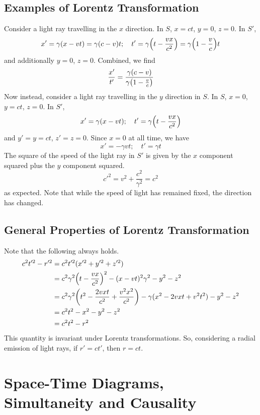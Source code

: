 \documentclass{article}
\begin{document}
\subsection{Examples of Lorentz Transformation}
Consider a light ray travelling in the $x$ direction. In $S$, $x=ct$, $y=0$, $z=0$. In $S'$,
\[ x' = \gamma(x-vt) = \gamma(c-v)t;\quad t' = \gamma\qty(t - \frac{vx}{c^2}) = \gamma\qty(1 - \frac{v}{c})t \]
and additionally $y=0$, $z=0$. Combined, we find
\[ \frac{x'}{t'} = \frac{\gamma(c - v)}{\gamma\qty(1 - \frac{v}{c})} \]
Now instead, consider a light ray travelling in the $y$ direction in $S$. In $S$, $x=0$, $y=ct$, $z=0$. In $S'$,
\[ x' = \gamma(x-vt);\quad t' = \gamma\qty(t - \frac{vx}{c^2}) \]
and $y' = y = ct$, $z' = z = 0$. Since $x=0$ at all time, we have
\[ x' = -\gamma vt;\quad t' = \gamma t \]
The square of the speed of the light ray in $S'$ is given by the $x$ component squared plus the $y$ component squared.
\[ c'^2 = v^2 + \frac{c^2}{\gamma^2} = c^2 \]
as expected. Note that while the speed of light has remained fixed, the direction has changed.

\subsection{General Properties of Lorentz Transformation}
Note that the following always holds.
\begin{align*}
	c^2 t'^2 - r'^2 & = c^2 t'^2 (x'^2 + y'^2 + z'^2)                                                                            \\
	                & = c^2 \gamma^2 \qty(t - \frac{vx}{c^2})^2 - (x - vt)^2 \gamma^2 - y^2 - z^2                                \\
	                & = c^2 \gamma^2 \qty(t^2 - \frac{2vxt}{c^2} + \frac{v^2x^2}{c^2}) - \gamma(x^2 - 2vxt + v^2t^2) - y^2 - z^2 \\
	                & = c^2 t^2 - x^2 - y^2 - z^2                                                                                \\
	                & = c^2 t^2 - r^2
\end{align*}
This quantity is invariant under Lorentz transformations. So, considering a radial emission of light rays, if $r' = ct'$, then $r = ct$.

\section{Space-Time Diagrams, Simultaneity and Causality}
\end{document}
